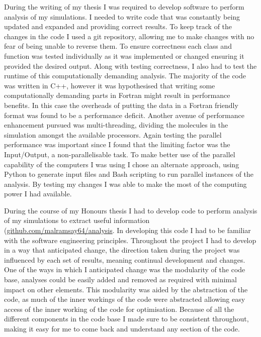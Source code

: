 
During the writing of my thesis I was required to develop software to perform analysis of my simulations. I needed to write code that was constantly being updated and expanded and providing correct results. To keep track of the changes in the code I used a git repository, allowing me to make changes with no fear of being unable to reverse them. To ensure correctness each class and function was tested individually as it was implemented or changed ensuring it provided the desired output. Along with testing correctness, I also had to test the runtime of this computationally demanding analysis. The majority of the code was written in C++, however it was hypothesised that writing some computationally demanding parts in Fortran might result in performance benefits. In this case the overheads of putting the data in a Fortran friendly format was found to be a performance deficit. Another avenue of performance enhancement pursued was multi-threading, dividing the molecules in the simulation amongst the available processors. Again testing the parallel performance was important since I found that the limiting factor was the Input/Output, a non-parallelisable task. To make better use of the parallel capability of the computers I was using I chose an alternate approach, using Python to generate input files and Bash scripting to run parallel instances of the analysis. By testing my changes I was able to make the most of the computing power I had available.


During the course of my Honours thesis I had to develop code to perform analysis of my simulations to extract useful information (\href{https://github.com/malramsay64/analysis}{github.com/malramsay64/analysis}. In developing this code I had to be familiar with the software engineering principles. Throughout the project I had to develop in a way that anticipated change, the direction taken during the project was influenced by each set of results, meaning continual development and changes. One of the ways in which I anticipated change was the modularity of the code base, analyses could be easily added and removed as required with minimal impact on other elements. This modularity was aided by the abstraction of the code, as much of the inner workings of the code were abstracted allowing easy access of the inner working of the code for optimisation. Because of all the different components in the code base I made sure to be consistent throughout, making it easy for me to come back and understand any section of the code.


